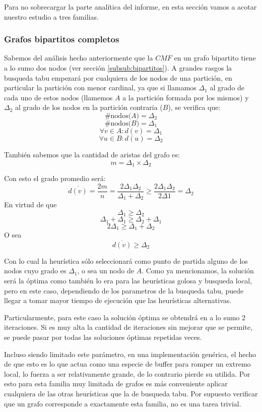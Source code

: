 Para no sobrecargar la parte anal\'itica del informe, en esta 
secci\'on vamos a acotar nuestro estudio a tres familias.

\subsubsection{Grafos bipartitos completos}

Sabemos del an\'alisis hecho anteriormente que la $CMF$ en un
grafo bipartito tiene a lo sumo dos nodos 
(ver secci\'on \ref{subsub:bipartitos}).
A grandes rasgos la busqueda tabu empezar\'a por cualquiera
de los nodos de una partici\'on, en particular la partici\'on
con menor cardinal, ya que si llamamos $\Delta_1$ al grado 
de cada uno de estos nodos (llamemos $A$ a la partici\'on formada
por los mismos) y $\Delta_2$ al grado de los nodos
en la partici\'on contraria ($B$), se verifica que:
\[ \text{\#nodos($A$)}= \Delta_2 \]
\[ \text{\#nodos($B$)}= \Delta_1 \]
\[ \forall v \in A: d(v)= \Delta_1 \]
\[ \forall u \in B: d(u)= \Delta_2 \]

Tambi\'en sabemos que la cantidad de aristas del grafo es:
\[ m = \Delta_1 \times \Delta_2 \]

Con esto el grado promedio ser\'a:
\[ \overline{d(v)} = \frac{2m}{n} = \frac{2 \Delta_1 \Delta_2}
{\Delta_1 + \Delta_2} \geq \frac{2 \Delta_1 \Delta_2}{2 \Delta1} 
= \Delta_2 \]
En virtud de que
\[ \Delta_1 \geq \Delta_2 \]
\[ \Delta_1 + \Delta_1 \geq \Delta_2 + \Delta_1 \]
\[ 2 \Delta_1 \geq \Delta_1 + \Delta_2 \]
O sea
\[ \overline{d(v)} \geq \Delta_2 \]

Con lo cual la heur\'istica s\'olo seleccionar\'a como 
punto de partida alguno de los nodos cuyo grado es $\Delta_1$, 
o sea un nodo de $A$. Como ya mencionamos, la soluci\'on ser\'a
la \'optima como tambi\'en lo era para las heur\'isticas golosa
y busqueda local, pero en este caso, dependiendo de los 
parametros de la busqueda tabu, puede llegar a tomar mayor 
tiempo de ejecuci\'on que las heur\'isticas alternativas.

Particularmente, para este caso la soluci\'on \'optima se 
obtendr\'a en a lo sumo 2 iteraciones. Si es muy alta la
cantidad de iteraciones sin mejorar que se permite, se 
puede pasar por todas las soluciones \'optimas repetidas 
veces.

Incluso siendo limitado este par\'ametro, en una implementaci\'on
gen\'erica, el hecho de que esto es lo que actua como una especie
de buffer para romper un extremo local, lo fuerza a ser relativamente
grande, de lo contrario pierde su utilida. Por esto para esta familia
muy limitada de grafos es m\'as conveniente aplicar cualquiera de las
otras heur\'isticas que la de busqueda tabu. Por supuesto verificar 
que un grafo corresponde a exactamente esta familia, no es una
tarea trivial.

